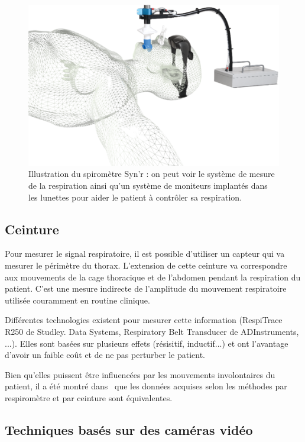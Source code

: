 \begin{figure}[h!]
	\begin{center}
		\includegraphics[width=12cm]{images/spiro}
	\end{center}
	\caption[Illustration du spiromètre Syn'r]{Illustration du spiromètre Syn'r : on peut voir le système de mesure de la respiration ainsi qu'un système de moniteurs implantés dans les lunettes pour aider le patient à contrôler sa respiration.} 
	\label{fig:spirometre}
\end{figure}

\subsection{Ceinture}

Pour mesurer le signal respiratoire, il est possible d'utiliser un capteur qui va mesurer le périmètre du thorax. L'extension de cette ceinture va correspondre aux mouvements de la cage thoracique et de l'abdomen pendant la respiration du patient. C'est une mesure indirecte de l'amplitude du mouvement respiratoire utilisée couramment en routine clinique. 

Différentes technologies existent pour mesurer cette information (RespiTrace R250 de Studley. Data Systems, Respiratory Belt Transducer de ADInstruments, ...). Elles sont basées sur plusieurs effets (résisitif, inductif...) et ont l'avantage d'avoir un faible coût et de ne pas perturber le patient.

Bien qu'elles puissent être influencées par les mouvements involontaires du patient, il a été montré dans~\cite{Guivarch2004Sync} que les données acquises selon les méthodes par respiromètre et par ceinture sont équivalentes.

\subsection{Techniques basés sur des caméras vidéo}

